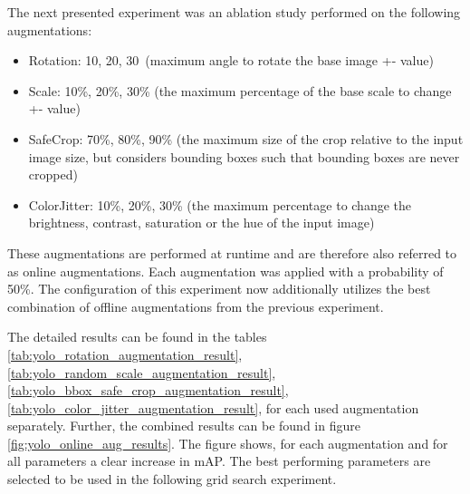 The next presented experiment was an ablation study performed on the following augmentations:
\begin{itemize}
    \item Rotation: 10\textdegree, 20\textdegree, 30\textdegree\ (maximum angle to rotate the base image +- value)
    \item Scale: 10\%, 20\%, 30\% (the maximum percentage of the base scale to change +- value)
    \item SafeCrop: 70\%, 80\%, 90\% (the maximum size of the crop relative to the input image size, but considers bounding boxes such that bounding boxes are never cropped)
    \item ColorJitter: 10\%, 20\%, 30\% (the maximum percentage to change the brightness, contrast, saturation or the hue of the input image)
\end{itemize}
These augmentations are performed at runtime and are therefore also referred to as  online augmentations.
Each augmentation was applied with a probability of 50\%.
The configuration of this experiment now additionally utilizes the best combination of offline augmentations from the previous experiment.




The detailed results can be found in the tables \ref{tab:yolo_rotation_augmentation_result}, \ref{tab:yolo_random_scale_augmentation_result}, \ref{tab:yolo_bbox_safe_crop_augmentation_result}, \ref{tab:yolo_color_jitter_augmentation_result}, for each used augmentation separately.
Further, the combined results can be found in figure \ref{fig:yolo_online_aug_results}.
The figure shows, for each augmentation and for all parameters a clear increase in \ac{mAP}.
The best performing parameters are selected to be used in the following grid search experiment.

